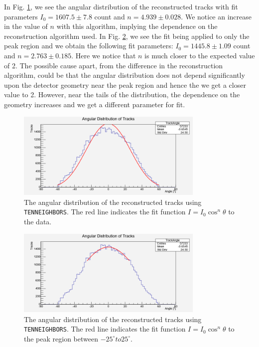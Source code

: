 \documentclass[a4paper]{report}
\numberwithin{equation}{section}
\begin{document}
In Fig. \ref{fig:tentrack_fit}, we see the angular distribution of the reconstructed tracks with fit parameters $I_0 = 1607.5 \pm 7.8$ count and $n = 4.939 \pm 0.028$. We notice an increase in the value of $n$ with this algorithm, implying the dependence on the reconstruction algorithm used. In Fig. \ref{fig:tentrack_peak}, we see the fit being applied to only the peak region and we obtain the following fit parameters: $I_0 = 1445.8 \pm 1.09$ count and $n = 2.763 \pm 0.185$. Here we notice that $n$ is much closer to the expected value of 2. The possible cause apart, from the difference in the reconstruction algorithm, could be that the angular distribution does not depend significantly upon the detector geometry near the peak region and hence the we get a closer value to 2. However, near the tails of the distribution, the dependence on the geometry increases and we get a different parameter for fit. 

\begin{figure}[!h]
	\centering
	\includegraphics[width=0.8\textwidth]{tentrack_fit.png}
	\caption{The angular distribution of the reconstructed tracks using \texttt{TENNEIGHBORS}. The red line indicates the fit function $I = I_0 \cos^n \theta$
			to the data.}
	\label{fig:tentrack_fit}
\end{figure}

\begin{figure}[!h]
	\centering
	\includegraphics[width=0.8\textwidth]{tentrack_peak.png}
	\caption{The angular distribution of the reconstructed tracks using \texttt{TENNEIGHBORS}. The red line indicates the fit function $I = I_0 \cos^n \theta$
			to the peak region between $-25^{\circ} to 25^{\circ}$.}
	\label{fig:tentrack_peak}
\end{figure}
\end{document}
